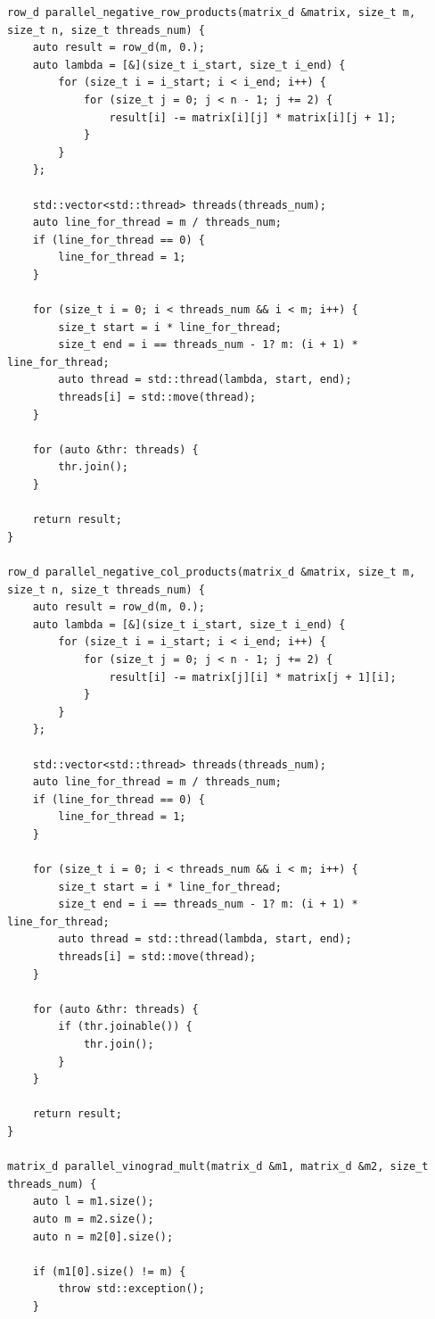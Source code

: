 \documentclass[a4paper,12pt]{article}
\begin{document}
\begin{lstlisting}[frame=single,caption=параллельный Алгоритм Винограда, breaklines]
row_d parallel_negative_row_products(matrix_d &matrix, size_t m, size_t n, size_t threads_num) {
    auto result = row_d(m, 0.);
    auto lambda = [&](size_t i_start, size_t i_end) {
        for (size_t i = i_start; i < i_end; i++) {
            for (size_t j = 0; j < n - 1; j += 2) {
                result[i] -= matrix[i][j] * matrix[i][j + 1];
            }
        }
    };

    std::vector<std::thread> threads(threads_num);
    auto line_for_thread = m / threads_num;
    if (line_for_thread == 0) {
        line_for_thread = 1;
    }

    for (size_t i = 0; i < threads_num && i < m; i++) {
        size_t start = i * line_for_thread;
        size_t end = i == threads_num - 1? m: (i + 1) * line_for_thread;
        auto thread = std::thread(lambda, start, end);
        threads[i] = std::move(thread);
    }

    for (auto &thr: threads) {
        thr.join();
    }

    return result;
}

row_d parallel_negative_col_products(matrix_d &matrix, size_t m, size_t n, size_t threads_num) {
    auto result = row_d(m, 0.);
    auto lambda = [&](size_t i_start, size_t i_end) {
        for (size_t i = i_start; i < i_end; i++) {
            for (size_t j = 0; j < n - 1; j += 2) {
                result[i] -= matrix[j][i] * matrix[j + 1][i];
            }
        }
    };

    std::vector<std::thread> threads(threads_num);
    auto line_for_thread = m / threads_num;
    if (line_for_thread == 0) {
        line_for_thread = 1;
    }

    for (size_t i = 0; i < threads_num && i < m; i++) {
        size_t start = i * line_for_thread;
        size_t end = i == threads_num - 1? m: (i + 1) * line_for_thread;
        auto thread = std::thread(lambda, start, end);
        threads[i] = std::move(thread);
    }

    for (auto &thr: threads) {
        if (thr.joinable()) {
            thr.join();
        }
    }

    return result;
}

matrix_d parallel_vinograd_mult(matrix_d &m1, matrix_d &m2, size_t threads_num) {
    auto l = m1.size();
    auto m = m2.size();
    auto n = m2[0].size();

    if (m1[0].size() != m) {
        throw std::exception();
    }


\end{lstlisting}
\end{document}
